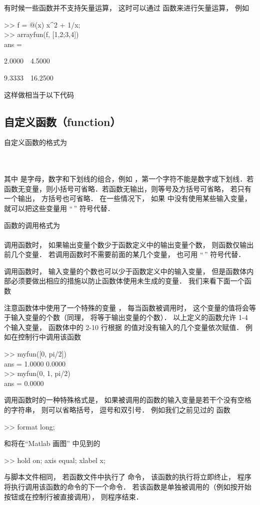 有时候一些函数并不支持矢量运算， 这时可以通过  函数来进行矢量运算， 例如
\begin{Command}
>> f = @(x) x\^{}2 + 1/x;\\
>> arrayfun(f, [1,2;3,4])\\
ans = \par
2.0000\ \ 4.5000\par
9.3333\ \ 16.2500
\end{Command}
这样做相当于以下代码


\subsection{自定义函数（function）}
自定义函数的格式为\\
\\
\\

其中  是字母，数字和下划线的组合，例如 ，第一个字符不能是数字或下划线．若函数无变量，则小括号可省略．若函数无输出，则等号及方括号可省略， 若只有一个输出， 方括号也可省略． 在一些情况下， 如果  中没有使用某些输入变量， 就可以把这些变量用 “\;\,\x{\~}” 符号代替．

函数的调用格式为\\
\\
调用函数时， 如果输出变量个数少于函数定义中的输出变量个数， 则函数仅输出前几个变量． 若调用函数时不需要前面的某几个变量， 也可用 “\;\,\x{\~}” 符号代替．

调用函数时， 输入变量的个数也可以少于函数定义中的输入变量， 但是函数体内部必须要做出相应的措施以防止函数体使用未生成的变量． 我们来看下面一个函数

注意函数体中使用了一个特殊的变量 ， 每当函数被调用时， 这个变量的值将会等于输入变量的个数（同理，  将等于输出变量的个数）． 以上定义的函数允许 1-4 个输入变量， 函数体中的 2-10 行根据  的值对没有输入的几个变量依次赋值． 例如在控制行中调用该函数
\begin{Command}
>> myfun([0, pi/2])\\
ans = 1.0000    0.0000\\
>> myfun(0, 1, pi/2)\\
ans = 0.0000
\end{Command}

调用函数时的一种特殊格式是， 如果被调用的函数的输入变量是若干个没有空格的字符串， 则可以省略括号， 逗号和双引号． 例如我们之前见过的  函数
\begin{Command}
>> format {\color{string}long};
\end{Command}
和将在“Matlab 画图” 中见到的
\begin{Command}
>> hold {\color{string}on}; axis {\color{string}equal}; xlabel {\color{string}x};
\end{Command}

与脚本文件相同， 若函数文件中执行了  命令， 该函数的执行将立即终止， 程序将执行调用该函数的命令的下一个命令． 若该函数是单独被调用的（例如按开始按钮或在控制行被直接调用）， 则程序结束．